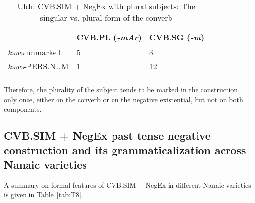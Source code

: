 \documentclass[output=paper]{langscibook}
\begin{document}
\begin{table}[!h]
    \caption{Ulch: CVB.SIM + NegEx with plural subjects: The singular vs. plural form of the converb}
    \label{tab:T7}
    \begin{tabular}{@{}lll@{}}
    \lsptoprule
     & CVB.PL (\textit{-mAr}) & CVB.SG (\textit{-m}) \\ \midrule
    \textit{kəwə} unmarked & 5 & 3 \\
    \textit{kəwə}-PERS.NUM & 1 & 12 \\ \lspbottomrule
    \end{tabular}
\end{table}

Therefore, the plurality of the subject tends to be marked in the construction only once, either on the converb or on the negative existential, but not on both components.

\subsection{CVB.SIM + NegEx past tense negative construction and its grammaticalization across Nanaic varieties}\label{sec:T5.5}

A summary on formal features of CVB.SIM + NegEx in different Nanaic varieties is given in Table \ref{tab:T8}.
\end{document}
